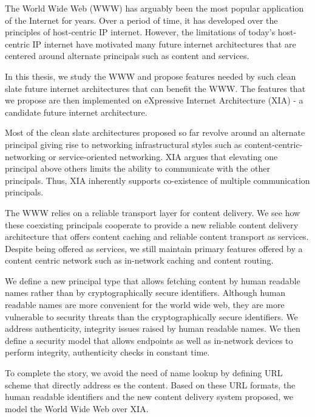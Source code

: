 \abstract

The World Wide Web (WWW) has arguably been the most popular
application of the Internet for years. Over a period of time, it has
developed over the principles of host-centric IP internet. However,
the limitations of today's host-centric IP internet have motivated
many future internet architectures that are centered around alternate
principals such as content and services.

In this thesis, we study the WWW and propose features needed by such
clean slate future internet architectures that can benefit the
WWW. The features that we propose are then implemented on eXpressive
Internet Architecture (XIA) - a candidate future internet
architecture.

Most of the clean slate architectures proposed so far revolve around
an alternate principal giving rise to networking infrastructural
styles such as content-centric-networking or service-oriented
networking. XIA argues that elevating one principal above others
limits the ability to communicate with the other principals. Thus, XIA
inherently supports co-existence of multiple communication principals.

The WWW relies on a reliable transport layer for content delivery. We
see how these coexisting principals cooperate to provide a new
reliable content delivery architecture that offers content caching and
reliable content transport as services. Despite being offered as
services, we still maintain primary features offered by a content
centric network such as in-network caching and content routing.

We define a new principal type that allows fetching content by human
readable names rather than by cryptographically secure
identifiers. Although human readable names are more convenient for the
world wide web, they are more vulnerable to security threats than the
cryptographically secure identifiers. We address authenticity,
integrity issues raised by human readable names. We then define a
security model that allows endpoints as well as in-network devices to
perform integrity, authenticity checks in constant time.

To complete the story, we avoid the need of name lookup by defining
URL scheme that directly address es the content. Based on these URL
formats, the human readable identifiers and the new content delivery
system proposed, we model the World Wide Web over XIA.
